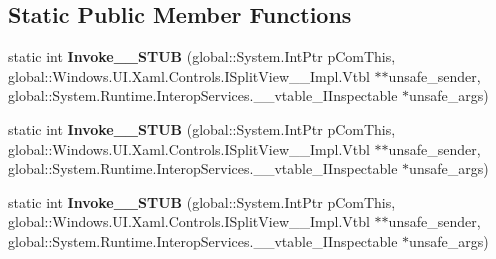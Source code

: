 \subsection*{Static Public Member Functions}
\begin{DoxyCompactItemize}
\item 
\mbox{\label{struct_windows_1_1_foundation_1_1_typed_event_handler___a___windows___u_i___xaml___controls___spbe6956be4b8dd5e753952ceff0bf2f92_a97e885d21703c3983562f544c8f98568}} 
static int {\bfseries Invoke\+\_\+\+\_\+\+S\+T\+UB} (global\+::\+System.\+Int\+Ptr p\+Com\+This, global\+::\+Windows.\+U\+I.\+Xaml.\+Controls.\+I\+Split\+View\+\_\+\+\_\+\+Impl.\+Vtbl $\ast$$\ast$unsafe\+\_\+sender, global\+::\+System.\+Runtime.\+Interop\+Services.\+\_\+\+\_\+vtable\+\_\+\+I\+Inspectable $\ast$unsafe\+\_\+args)
\item 
\mbox{\label{struct_windows_1_1_foundation_1_1_typed_event_handler___a___windows___u_i___xaml___controls___spbe6956be4b8dd5e753952ceff0bf2f92_a97e885d21703c3983562f544c8f98568}} 
static int {\bfseries Invoke\+\_\+\+\_\+\+S\+T\+UB} (global\+::\+System.\+Int\+Ptr p\+Com\+This, global\+::\+Windows.\+U\+I.\+Xaml.\+Controls.\+I\+Split\+View\+\_\+\+\_\+\+Impl.\+Vtbl $\ast$$\ast$unsafe\+\_\+sender, global\+::\+System.\+Runtime.\+Interop\+Services.\+\_\+\+\_\+vtable\+\_\+\+I\+Inspectable $\ast$unsafe\+\_\+args)
\item 
\mbox{\label{struct_windows_1_1_foundation_1_1_typed_event_handler___a___windows___u_i___xaml___controls___spbe6956be4b8dd5e753952ceff0bf2f92_a97e885d21703c3983562f544c8f98568}} 
static int {\bfseries Invoke\+\_\+\+\_\+\+S\+T\+UB} (global\+::\+System.\+Int\+Ptr p\+Com\+This, global\+::\+Windows.\+U\+I.\+Xaml.\+Controls.\+I\+Split\+View\+\_\+\+\_\+\+Impl.\+Vtbl $\ast$$\ast$unsafe\+\_\+sender, global\+::\+System.\+Runtime.\+Interop\+Services.\+\_\+\+\_\+vtable\+\_\+\+I\+Inspectable $\ast$unsafe\+\_\+args)
\item 
\mbox{\label{struct_windows_1_1_foundation_1_1_typed_event_handler___a___windows___u_i___xaml___controls___spbe6956be4b8dd5e753952ceff0bf2f92_a97e885d21703c3983562f544c8f98568}} 
$$
\end{DoxyCompactItemize}
